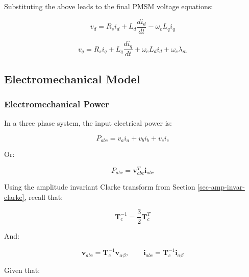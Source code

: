 \documentclass{article}
\begin{document}
Substituting the above leads to the final PMSM voltage equations:

\begin{equation}
\label{eqn-vd}
    v_d = R_si_d + L_d\frac{di_d}{dt} - \omega_eL_qi_q
\end{equation}

\begin{equation}
\label{eqn-vq}
    v_q = R_si_q + L_q\frac{di_q}{dt} + \omega_eL_di_d + \omega_e\lambda_m
\end{equation}

\subsection{Electromechanical Model}
\label{sec:electromechanical-model}

\subsubsection{Electromechanical Power}
\label{sec:electromechanical-power}

In a three phase system, the input electrical power is:

\begin{equation}
\label{eqn-abc-power}
    P_{abc} = v_ai_a + v_bi_b + v_ci_c
\end{equation}

Or:

\begin{equation}
\label{eqn-abc-power-dot-product}
    P_{abc} = \mathbf{v}_{abc}^T\mathbf{i}_{abc}
\end{equation}

Using the amplitude invariant Clarke transform from Section \ref{sec-amp-invar-clarke}, recall that:

\begin{equation}
\label{eqn-inverse-clarke-transpose}
    \mathbf{T}_c^{-1} = \frac{3}{2}\mathbf{T}_c^T
\end{equation}

And:

\begin{equation}
    \mathbf{v}_{abc} = \mathbf{T}_c^{-1}\mathbf{v}_{\alpha\beta}, \qquad
    \mathbf{i}_{abc} = \mathbf{T}_c^{-1}\mathbf{i}_{\alpha\beta}
\end{equation}

Given that:
\end{document}
